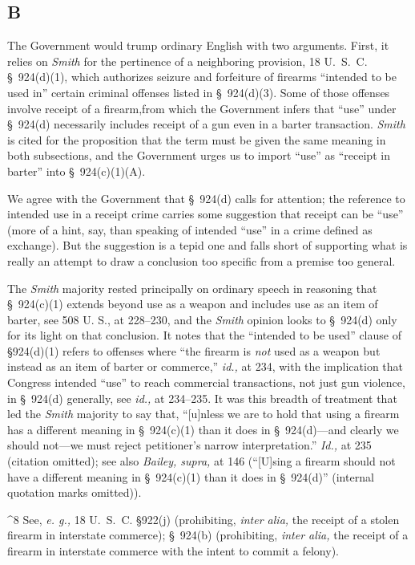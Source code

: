 \subsection{B}

  The Government would trump ordinary English with two arguments. First,
it relies on \emph{Smith} for the pertinence of a neighboring provision,
18 U.~S.~C. \S~924(d)(1), which authorizes seizure and forfeiture
of firearms ``intended to be used in'' certain criminal offenses
listed in \S~924(d)(3). Some of those offenses involve receipt of a
firearm,\footnotemark[8] from which the Government infers that ``use'' under
\S~924(d) necessarily includes receipt of a gun even in a barter
transaction. \emph{Smith} is cited for the proposition that the term must
be given the same meaning in both subsections, and the Government urges
us to import ``use'' as ``receipt in barter'' into \S~924(c)(1)(A).

  We agree with the Government that \S~924(d) calls for attention; the
reference to intended use in a receipt crime carries some suggestion
that receipt can be ``use'' (more of a hint, say, than speaking of
intended ``use'' in a crime defined as exchange). But the suggestion
is a tepid one and falls short of supporting what is really an attempt
to draw a conclusion too specific from a premise too general.

  The \emph{Smith} majority rested principally on ordinary speech in
reasoning that \S~924(c)(1) extends beyond use as a weapon and
includes use as an item of barter, see 508 U. S., at 228--230,
and the \emph{Smith} opinion looks to \S~924(d) only for its light
on that conclusion. It notes that the ``intended to be used''
clause of \S924(d)(1) refers to offenses where ``the firearm is
\newpage  \emph{not} used as a weapon but instead as an item of barter or
commerce,'' \emph{id.,} at 234, with the implication that Congress
intended ``use'' to reach commercial transactions, not just gun
violence, in \S~924(d) generally, see \emph{id.,} at 234--235. It
was this breadth of treatment that led the \emph{Smith} majority to say
that, ``[u]nless we are to hold that using a firearm has a different
meaning in \S~924(c)(1) than it does in \S~924(d)---and clearly we
should not---we must reject petitioner's narrow interpretation.''
\emph{Id.,} at 235 (citation omitted); see also \emph{Bailey, supra,}
at 146 (``[U]sing a firearm should not have a different meaning in
\S~924(c)(1) than it does in \S~924(d)'' (internal quotation marks
omitted)).

^8 See, \emph{e. g.,} 18 U.~S.~C. \S922(j) (prohibiting, \emph{inter
alia,} the receipt of a stolen firearm in interstate commerce);
\S~924(b) (prohibiting, \emph{inter alia,} the receipt of a firearm in
interstate commerce with the intent to commit a felony).

